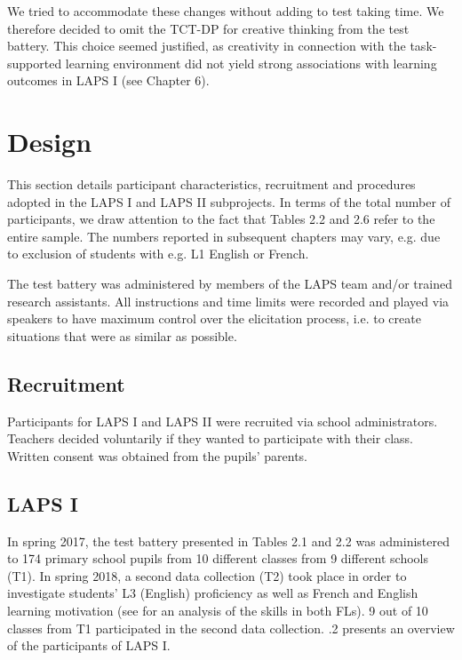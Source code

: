 \documentclass[output=paper]{langsci/langscibook}
\begin{document}
We tried to accommodate these changes without adding to test taking time. We therefore decided to omit the TCT-DP for creative thinking from the test battery. This choice seemed justified, as creativity in connection with the task-supported learning environment did not yield strong associations with learning outcomes in LAPS I (see Chapter 6). 

\section{Design}

This section details participant characteristics, recruitment and procedures adopted in the LAPS I and LAPS II subprojects. In terms of the total number of participants, we draw attention to the fact that Tables 2.2 and 2.6 refer to the entire sample. The numbers reported in subsequent chapters may vary, e.g. due to exclusion of students with e.g. L1 English or French. 

The test battery was administered by members of the LAPS team and/or trained research assistants. All instructions and time limits were recorded and played via speakers to have maximum control over the elicitation process, i.e. to create situations that were as similar as possible. 

 \subsection{Recruitment}


Participants for LAPS I and LAPS II were recruited via school administrators. Teachers decided voluntarily if they wanted to participate with their class. Written consent was obtained from the pupils’ parents. 

 \subsection{LAPS I}


In spring 2017, the test battery presented in Tables 2.1 and 2.2 was administered to 174 primary school pupils from 10 different classes from 9 different schools (T1). In spring 2018, a second data collection (T2) took place in order to investigate students’ L3 (English) proficiency as well as French and English learning motivation (see \citealt{BertheleUdry2019} for an analysis of the skills in both FLs). 9 out of 10 classes from T1 participated in the second data collection. .2 presents an overview of the participants of LAPS I.
\end{document}
